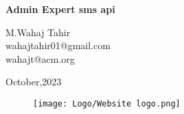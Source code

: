 \begin{Titlepage}
\begin{center}
    \vspace*{2cm}
    
    \textbf{\Huge Admin Expert sms api  }\\
    \vspace*{2cm}
    
      
      \vspace{0.2cm}
      \begin{center}
          \large M.Wahaj Tahir\\wahajtahir01@gmail.com\\wahajt@acm.org
      \end{center} 
    
    \vspace{1.5cm}
    \begin{center}
    \large October,2023 
    \end{center}
    
    \vfill
    \vspace{0.8cm}
    \begin{figure}[hb]
        \centering
        \texttt{[image: Logo/Website logo.png]}
    \end{figure}
    \end{center}
\end{Titlepage}








